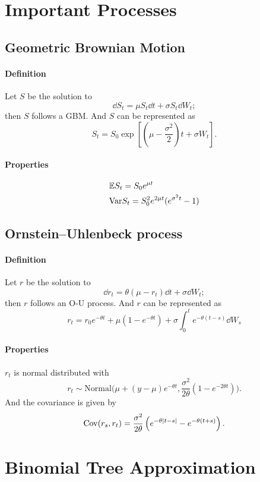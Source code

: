 \section{Important Processes}

\subsection*{Geometric Brownian Motion}

\paragraph{Definition}
Let $S$ be the solution to 
$$\dd S_t = \mu S_t \dd t + \sigma S_t \dd W_t;$$
then $S$ follows a GBM. And $S$ can be represented as
$$S_t = S_0 \exp \left[  (\mu - \frac{\sigma^2}{2})t + \sigma W_t \right].$$

\paragraph{Properties}
\begin{align*}
	&\mathbb{E} S_t = S_0 e^{\mu t} \\
	&\mathrm{Var} S_t  = S_0^2 e^{2\mu t}( e^{\sigma^2 t} -1 )
\end{align*}

\subsection*{Ornstein–Uhlenbeck process}
\paragraph{Definition}
Let $r$ be the solution to 
$$\dd r_t = \theta (\mu - r_t) \dd t + \sigma   \dd W_t;$$
then $r$ follows an O-U process. And $r$ can be represented as 
$$r_t = r_0 e^{-\theta t} + \mu(1 - e^{-\theta t}  ) + \sigma \int^t_0 e^{-\theta(t-s)}\dd W_s $$

\paragraph{Properties} $r_t$ is normal distributed with
$$r_t \sim \mathrm{Normal}\Big(  \mu + (y-\mu)e^{-\theta t}, \frac{\sigma^2}{2\theta}(1 - e^{-2\theta t})  \Big).$$
And the covariance is given by
$$\mathrm{Cov}(r_s, r_t) = \frac{\sigma^2}{2\theta} \left(  e^{-\theta|t-s|} - e^{-\theta (t+s)} \right).$$

\section{Binomial Tree Approximation}

